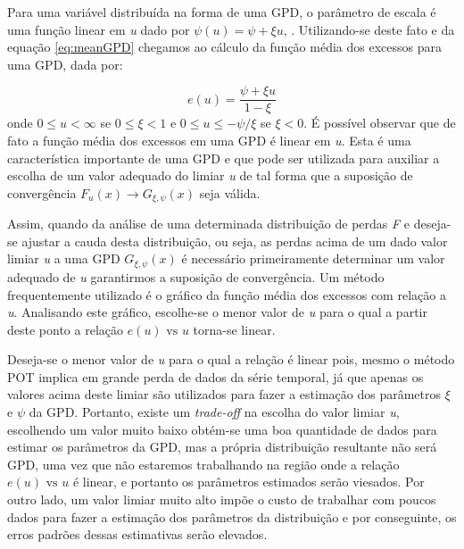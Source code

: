 \documentclass[review]{elsarticle}
\theoremstyle{definition}
\begin{document}
Para uma variável distribuída na forma de uma GPD, o parâmetro de escala é uma função linear em \emph{u} dado por $\psi(u)=\psi + \xi u$, \cite[Teorema 3.4.13(e)]{Embrechts1997}. Utilizando-se deste fato e da equação \eqref{eq:meanGPD} chegamos ao cálculo da função média dos excessos para uma GPD, dada por:

\begin{equation}
\label{eq:eu}
e(u)=\frac{\psi+\xi u}{1-\xi}
\end{equation}
onde $0 \leq u < \infty$ se $0 \leq \xi <1$ e $0 \leq u \leq -\psi / \xi$ se $\xi < 0$. É possível observar que de fato a função média dos excessos em uma GPD é linear em \emph{u}. Esta é uma característica importante de uma GPD e que pode ser utilizada para auxiliar a escolha de um valor adequado do limiar \emph{u} de tal forma que a suposição de convergência $F_u(x) \rightarrow G_{\xi, \psi}(x)$ seja válida.

Assim, quando da análise de uma determinada distribuição de perdas \emph{F} e deseja-se ajustar a cauda desta distribuição, ou seja, as perdas acima de um dado valor limiar \emph{u} a uma GPD $G_{\xi, \psi}(x)$ é necessário primeiramente determinar um valor adequado de \emph{u} garantirmos a suposição de convergência. Um método frequentemente utilizado é o gráfico da função média dos excessos com relação a \emph{u}. Analisando este gráfico, escolhe-se o menor valor de \emph{u} para o qual a partir deste ponto a relação $e(u) \text{ vs } u$ torna-se linear.

Deseja-se o menor valor de \emph{u} para o qual a relação é linear pois, mesmo o método POT implica em grande perda de dados da série temporal, já que apenas os valores acima deste limiar são utilizados para fazer a estimação dos parâmetros $\xi$ e $\psi$ da GPD. Portanto, existe um \emph{trade-off} na escolha do valor limiar \emph{u}, escolhendo um valor muito baixo obtém-se uma boa quantidade de dados para estimar os parâmetros da GPD, mas a própria distribuição resultante não será GPD, uma vez que não estaremos trabalhando na região onde a relação $e(u) \text{ vs } u$ é linear, e portanto os parâmetros estimados serão viesados. Por outro lado, um valor limiar muito alto impõe o custo de trabalhar com poucos dados para fazer a estimação dos parâmetros da distribuição e por conseguinte, os erros padrões dessas estimativas serão elevados.
\end{document}
